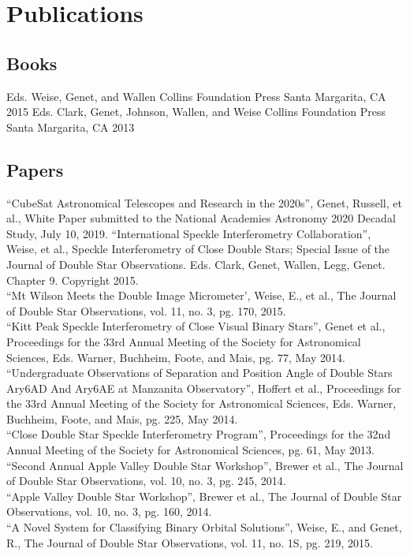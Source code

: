 \section{Publications}

\subsection{Books}
    {Eds. Weise, Genet, and Wallen}
    {Collins Foundation Press}
    {Santa Margarita, CA}
    {2015}
    {Eds. Clark, Genet, Johnson, Wallen, and Weise}
    {Collins Foundation Press}
    {Santa Margarita, CA}
    {2013}

\subsection{Papers}
``CubeSat Astronomical Telescopes and Research in the 2020s'',
    Genet, Russell, et al.,
    White Paper submitted to the National Academies Astronomy 2020 Decadal Study,
    July 10, 2019.
``International Speckle Interferometry Collaboration'',
    Weise, et al., 
    Speckle Interferometry of Close Double Stars; Special Issue of the Journal of Double Star Observations. 
    Eds. Clark, Genet, Wallen, Legg, Genet. 
    Chapter 9. 
    Copyright 2015.\\
``Mt Wilson Meets the Double Image Micrometer’, 
    Weise, E., et al., 
    The Journal of Double Star Observations, 
    vol. 11, no. 3, pg. 170, 
    2015.\\
``Kitt Peak Speckle Interferometry of Close Visual Binary Stars'', 
    Genet et al., 
    Proceedings for the 33rd Annual Meeting of the Society for Astronomical Sciences, 
    Eds. Warner, Buchheim, Foote, and Mais, 
    pg. 77, 
    May 2014.\\
``Undergraduate Observations of Separation and Position Angle of Double Stars Ary6AD And Ary6AE at Manzanita Observatory'', 
    Hoffert et al., 
    Proceedings for the 33rd Annual Meeting of the Society for Astronomical Sciences, 
    Eds. Warner, Buchheim, Foote, and Mais, 
    pg. 225, 
    May 2014.\\
``Close Double Star Speckle Interferometry Program'', 
    Proceedings for the 32nd Annual Meeting of the Society for Astronomical Sciences, 
    pg. 61, 
    May 2013.\\
``Second Annual Apple Valley Double Star Workshop'', 
    Brewer et al., 
    The Journal of Double Star Observations, 
    vol. 10, no. 3, pg. 245, 
    2014.\\
``Apple Valley Double Star Workshop'', 
    Brewer et al., 
    The Journal of Double Star Observations, 
    vol. 10, no. 3, pg. 160, 
    2014.\\
``A Novel System for Classifying Binary Orbital Solutions'', Weise, E., and Genet, R., The Journal of Double Star Observations, vol. 11, no. 1S, pg. 219, 2015.

